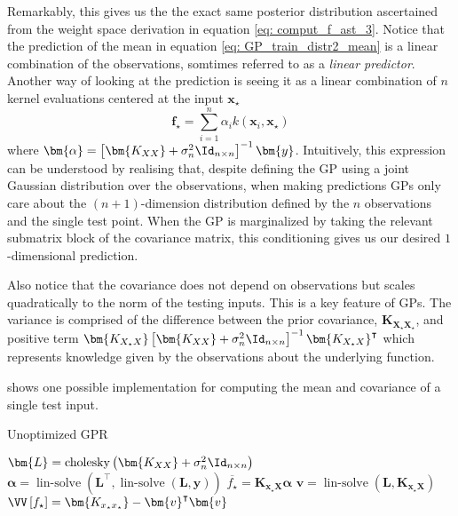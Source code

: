 Remarkably, this gives us the the exact same posterior distribution ascertained from the weight space derivation in equation \ref{eq: comput_f_ast_3}. Notice that the prediction of the mean in equation \ref{eq: GP_train_distr2_mean} is a linear combination of the observations, somtimes referred to as a {\it linear predictor}. Another way of looking at the prediction is seeing it as a linear combination of $n$ kernel evaluations centered at the input $\bm{x}_{\star}$
\[
    \bm{f}_{\star} = \sum_{i=1}^{n} \alpha_i k \left( \bm{x}_i , \bm{x}_{\star} \right)
\]
where $\bm{\alpha} = \left[ \bm{K_{XX}} + \sigma_n^2 \Id_{n \times n} \right]^{-1} \bm{y}$. Intuitively, this expression can be understood by realising that, despite defining the GP using a joint Gaussian distribution over the observations, when making predictions GPs only care about the $(n+1)$-dimension distribution defined by the $n$ observations and the single test point. When the GP is marginalized by taking the relevant submatrix block of the covariance matrix, this conditioning gives us our desired $1$-dimensional prediction.

Also notice that the covariance does not depend on observations but scales quadratically to the norm of the testing inputs. This is a key feature of GPs. The variance is comprised of the difference between the prior covariance, $\bm{K_{X_{\star}X_{\star}}}$, and positive term $\bm{K_{X_{\star}X}} \left[ \bm{K_{XX}} + \sigma_n^2 \Id_{n \times n} \right]^{-1} \bm{K_{X_{\star}X}}^{\intercal}$ which represents knowledge given by the observations about the underlying function.

 shows one possible implementation for computing the mean and covariance of a single test input.

\setcounter{GPRcount}{\value{algocf}}
{\centering
    \begin{minipage}{.85\linewidth}
        \begin{algorithm}[H]
            \caption{Unoptimized GPR}
            \label{alg: Unoptimized_GPR}
            \SetAlgoLined
            \DontPrintSemicolon

            \BlankLine
            $\bm{L} = \operatorname{cholesky} \left( \bm{K_{XX}} + \sigma_n^2 \Id_{n \times n} \right)$\;
            $\bm{\alpha} = \operatorname{lin-solve} \left( \bm{L}^{\intercal} , \operatorname{lin-solve} \left( \bm{L}, \bm{y} \right) \right)$\;
            $\overline{f_{\star}} = \bm{K_{x_{\star} X}} \bm{\alpha}$\;
            $\bm{v} = \operatorname{lin-solve} \left( \bm{L}, \bm{K_{x_{\star} X}} \right)$\;
            $\VV \left[ f_{\star} \right] = \bm{K_{x_{\star} x_{\star}}} - \bm{v}^{\intercal} \bm{v}$\;
            \BlankLine
        \end{algorithm}
    \end{minipage}
    \par
}

